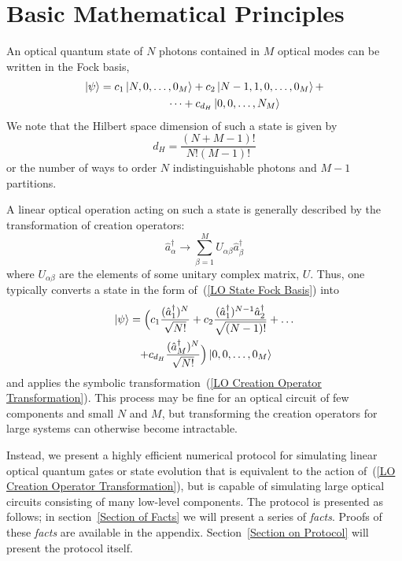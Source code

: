 \documentclass[aps,pra,twocolumn,showpacs,superscriptaddress,floatfix,10pt]{revtex4}
\begin{document}
\section{Basic Mathematical Principles}
\label{Intro}
An optical quantum state of $N$ photons contained in $M$ optical modes can be written in the Fock basis,
\begin{eqnarray}
	\label{LO State Fock Basis}
	\ket{\psi} = c_1 \ket{N,0,\dots,0_M} + c_2 \ket{N-1,1,0,\dots, 0_M} + \\* \dots  + c_{d_H} \ket{0,0,\dots,N_M}	\nonumber \quad \quad \quad \quad
\end{eqnarray}
We note that the Hilbert space dimension of such a state is given by
\begin{equation}
\label{Hilbert Space Dimension}
	d_H = \frac{(N+M-1)!}{N!(M-1)!}
\end{equation}
or the number of ways to order $N$ indistinguishable photons and $M-1$ partitions.

A linear optical operation acting on such a state is generally described by the transformation of creation operators:
\begin{equation}
\label{LO Creation Operator Transformation}
\hat{a}^\dagger_\alpha \rightarrow \sum_{\beta=1}^{M} U_{\alpha\beta} \hat{a}^\dagger_\beta
\end{equation}
where $U_{\alpha \beta}$ are the elements of some unitary complex matrix, $U$. Thus, one typically converts a state in the form of~(\ref{LO State Fock Basis}) into
\begin{eqnarray}
\ket{\psi} = \Big(c_1 \frac{(\hat{a}^\dagger_1)^N}{\sqrt{N!}} + c_2 \frac{ (\hat{a}^\dagger_1)^{N-1} \hat{a}^\dagger_2}{\sqrt{(N-1)!}} + \dots \\* + c_{d_H} \frac{(\hat{a}^\dagger_M)^N}{\sqrt{N!}}\Big) \ket{0,0,\dots,0_M} \quad \quad \nonumber
\end{eqnarray}
and applies the symbolic transformation~(\ref{LO Creation Operator Transformation}). This process may be fine for an optical circuit of few components and small $N$ and $M$, but transforming the creation operators for large systems can otherwise become intractable. 

Instead, we present a highly efficient numerical protocol for simulating linear optical quantum gates or state evolution that is equivalent to the action of~(\ref{LO Creation Operator Transformation}), but is capable of simulating large optical circuits consisting of many low-level components. The protocol is presented as follows; in section~\ref{Section of Facts} we will present a series of \textit{facts}. Proofs of these \textit{facts} are available in the appendix. Section~\ref{Section on Protocol} will present the protocol itself.
\end{document}
